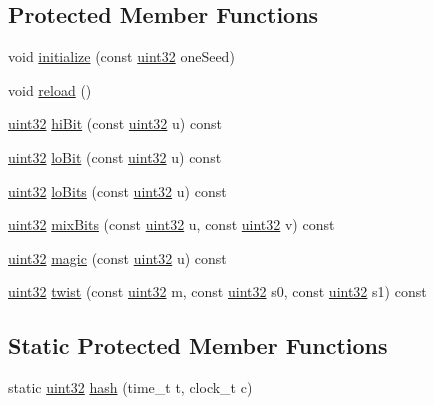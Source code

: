 \begin{CompactItemize}
\begin{CompactItemize}
\subsection*{Protected Member Functions}
\begin{CompactItemize}
\item 
void \hyperlink{classMTRand_9b9a20998f5c805af6301ce5c37dcfc3}{initialize} (const \hyperlink{classMTRand_45478edf9e24dcd2a5164bac3889d6a2}{uint32} oneSeed)
\item 
void \hyperlink{classMTRand_1d5fcb69d83f4d2fd653883c8352f86c}{reload} ()
\item 
\hyperlink{classMTRand_45478edf9e24dcd2a5164bac3889d6a2}{uint32} \hyperlink{classMTRand_45eea926a0602e4bb5c0b90b04779826}{hiBit} (const \hyperlink{classMTRand_45478edf9e24dcd2a5164bac3889d6a2}{uint32} u) const 
\item 
\hyperlink{classMTRand_45478edf9e24dcd2a5164bac3889d6a2}{uint32} \hyperlink{classMTRand_6f5a4a532e1c3acd42052046594205be}{loBit} (const \hyperlink{classMTRand_45478edf9e24dcd2a5164bac3889d6a2}{uint32} u) const 
\item 
\hyperlink{classMTRand_45478edf9e24dcd2a5164bac3889d6a2}{uint32} \hyperlink{classMTRand_d846f81f7abfc1b20c51d1563b8e5d45}{loBits} (const \hyperlink{classMTRand_45478edf9e24dcd2a5164bac3889d6a2}{uint32} u) const 
\item 
\hyperlink{classMTRand_45478edf9e24dcd2a5164bac3889d6a2}{uint32} \hyperlink{classMTRand_bdd5587252ed1ac89cb274e4bf4881da}{mixBits} (const \hyperlink{classMTRand_45478edf9e24dcd2a5164bac3889d6a2}{uint32} u, const \hyperlink{classMTRand_45478edf9e24dcd2a5164bac3889d6a2}{uint32} v) const 
\item 
\hyperlink{classMTRand_45478edf9e24dcd2a5164bac3889d6a2}{uint32} \hyperlink{classMTRand_8539a48116c85704c5101981cb0823e7}{magic} (const \hyperlink{classMTRand_45478edf9e24dcd2a5164bac3889d6a2}{uint32} u) const 
\item 
\hyperlink{classMTRand_45478edf9e24dcd2a5164bac3889d6a2}{uint32} \hyperlink{classMTRand_cf32530212717166e3d02dd3cc0b68c4}{twist} (const \hyperlink{classMTRand_45478edf9e24dcd2a5164bac3889d6a2}{uint32} m, const \hyperlink{classMTRand_45478edf9e24dcd2a5164bac3889d6a2}{uint32} s0, const \hyperlink{classMTRand_45478edf9e24dcd2a5164bac3889d6a2}{uint32} s1) const 
\end{CompactItemize}
\subsection*{Static Protected Member Functions}
\begin{CompactItemize}
\item 
static \hyperlink{classMTRand_45478edf9e24dcd2a5164bac3889d6a2}{uint32} \hyperlink{classMTRand_486885d03f38c844315d002e6312fa23}{hash} (time\_\-t t, clock\_\-t c)
\end{CompactItemize}

\end{CompactItemize}
\end{CompactItemize}

